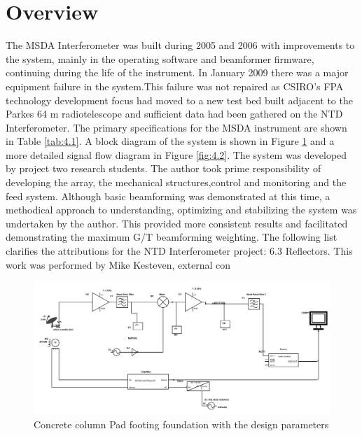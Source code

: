 {%


\section{Overview}
The MSDA Interferometer was built during 2005 and 2006 with improvements
to the system, mainly in the operating software and beamformer firmware,
continuing during the life of the instrument. In January 2009 there was
a major equipment failure in the system.This failure was not repaired as
CSIRO’s FPA technology development focus had moved to a new test bed
built adjacent to the Parkes 64 m radiotelescope and sufficient data had been
gathered on the NTD Interferometer.
The primary specifications for the MSDA instrument are shown in Table
\ref{tab:4.1}. A block diagram of the system is shown in Figure \ref{fig:4.1} and a more detailed signal flow diagram in Figure \ref{fig:4.2}.
The system was developed by project two research students.
 The author took prime responsibility of developing the array, the mechanical structures,control and monitoring and the feed system. Although basic beamforming was demonstrated at this time, a methodical approach to understanding, optimizing and stabilizing the system was undertaken by the author. This provided more consistent results and facilitated demonstrating
the maximum G/T beamforming weighting. The following list clarifies the
attributions for the NTD Interferometer project:
6.3 Reflectors. This work was performed by Mike Kesteven, external con


\begin{figure}
    \centering
\includegraphics[width=6in]{Figures/SCHEMATIC-DIAGRAM-DASPA.png}
\caption{Concrete column Pad footing foundation with the design parameters}
 \label{fig:4.1}
\end{figure}






}
